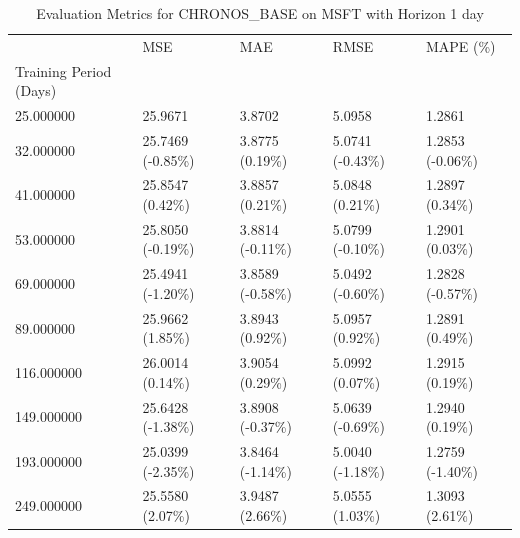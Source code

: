 \begin{table}
\caption{Evaluation Metrics for CHRONOS_BASE on MSFT with Horizon 1 day}
\label{tab:chronos_base_MSFT_h1_metrics}
\begin{tabular}{lllll}
\toprule
 & MSE & MAE & RMSE & MAPE (\%) \\
Training Period (Days) &  &  &  &  \\
\midrule
25.000000 & 25.9671 & 3.8702 & 5.0958 & 1.2861 \\
32.000000 & 25.7469 (-0.85\%) & 3.8775 (0.19\%) & 5.0741 (-0.43\%) & 1.2853 (-0.06\%) \\
41.000000 & 25.8547 (0.42\%) & 3.8857 (0.21\%) & 5.0848 (0.21\%) & 1.2897 (0.34\%) \\
53.000000 & 25.8050 (-0.19\%) & 3.8814 (-0.11\%) & 5.0799 (-0.10\%) & 1.2901 (0.03\%) \\
69.000000 & 25.4941 (-1.20\%) & 3.8589 (-0.58\%) & 5.0492 (-0.60\%) & 1.2828 (-0.57\%) \\
89.000000 & 25.9662 (1.85\%) & 3.8943 (0.92\%) & 5.0957 (0.92\%) & 1.2891 (0.49\%) \\
116.000000 & 26.0014 (0.14\%) & 3.9054 (0.29\%) & 5.0992 (0.07\%) & 1.2915 (0.19\%) \\
149.000000 & 25.6428 (-1.38\%) & 3.8908 (-0.37\%) & 5.0639 (-0.69\%) & 1.2940 (0.19\%) \\
193.000000 & 25.0399 (-2.35\%) & 3.8464 (-1.14\%) & 5.0040 (-1.18\%) & 1.2759 (-1.40\%) \\
249.000000 & 25.5580 (2.07\%) & 3.9487 (2.66\%) & 5.0555 (1.03\%) & 1.3093 (2.61\%) \\
\bottomrule
\end{tabular}
\end{table}
